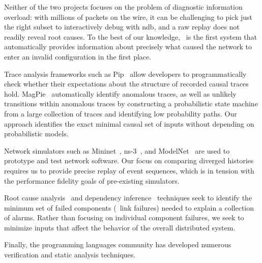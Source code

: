 Neither of the two projects focuses on the problem of diagnostic information
overload: with millions of packets on the wire, it can
be challenging to pick just the right subset to interactively debug with ndb,
and a raw replay does not readily reveal root causes. To the
best of our knowledge, \simulator~is the first system that automatically provides
information about precisely what caused the network to enter an invalid
configuration in the first place.


Trace analysis frameworks such as Pip~\cite{pip} allow developers
to programmatically check whether their expectations about the structure of
recorded causal
traces hold. MagPie~\cite{barham2004using} automatically identify anomalous
traces, as well as unlikely transitions within anomalous traces by constructing
a probabilistic state machine from a large collection of traces and
identifying low probability paths.
Our approach identifies the exact minimal causal set of inputs without
depending on probabilistic models.

Network simulators such as
Mininet~\cite{handigol2012reproducible}, ns-3~\cite{ns3}, and ModelNet~\cite{Vahdat:2002:SAL:844128.844154}
are used to prototype and test network software.
Our focus on comparing diverged histories requires us
to provide precise replay of event sequences, which is in tension with the performance
fidelity goals of pre-existing simulators.

Root cause analysis~\cite{yemini1996} and dependency inference~\cite{Kandula:2009:DDE:1592568.1592597}
techniques seek to identify the minimum set of failed
components (\eg~link failures) needed to explain a collection of alarms. Rather than
focusing on individual component failures, we seek to minimize inputs that affect the behavior
of the overall distributed system.


Finally, the programming languages community has developed
numerous verification and static analysis techniques.

